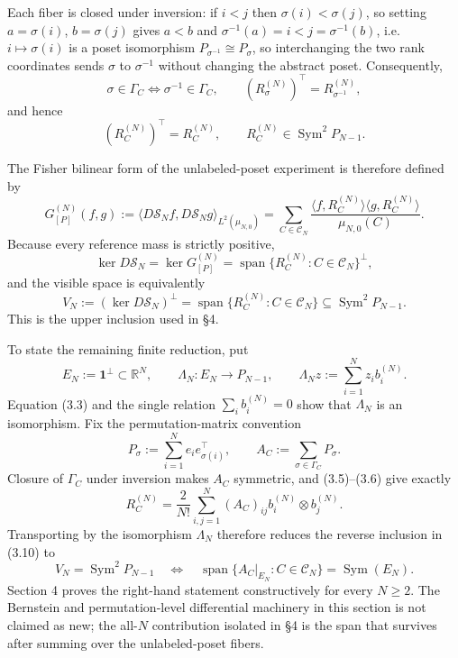 \documentclass[11pt]{article}
\begin{document}
Each fiber is closed under inversion: if \(i<j\) then \(\sigma(i)<\sigma(j)\), so setting \(a=\sigma(i)\), \(b=\sigma(j)\) gives \(a<b\) and \(\sigma^{-1}(a)=i<j=\sigma^{-1}(b)\), i.e. \(i\mapsto\sigma(i)\) is a poset isomorphism \(P_{\sigma^{-1}}\cong P_\sigma\), so interchanging the two rank coordinates sends \(\sigma\) to \(\sigma^{-1}\) without changing the abstract poset. Consequently, \[ \sigma\in\Gamma_C\Longleftrightarrow\sigma^{-1}\in\Gamma_C, \qquad \left(R_\sigma^{(N)}\right)^\top=R_{\sigma^{-1}}^{(N)}, \] and hence \[ \boxed{ \left(R_C^{(N)}\right)^\top=R_C^{(N)}, \qquad R_C^{(N)}\in\operatorname{Sym}^2P_{N-1}.} \tag{3.8} \]

The Fisher bilinear form of the unlabeled-poset experiment is therefore defined by \[ \boxed{ G_{[P]}^{(N)}(f,g) :=\langle D\mathscr S_Nf,D\mathscr S_Ng\rangle_{L^2(\mu_{N,0})} =\sum_{C\in\mathcal C_N} \frac{\langle f,R_C^{(N)}\rangle \langle g,R_C^{(N)}\rangle}{\mu_{N,0}(C)}.} \tag{3.9} \] Because every reference mass is strictly positive, \[ \ker D\mathscr S_N=\ker G_{[P]}^{(N)} =\operatorname{span}\{R_C^{(N)}:C\in\mathcal C_N\}^{\perp}, \] and the visible space is equivalently \[ \boxed{ V_N :=(\ker D\mathscr S_N)^\perp =\operatorname{span}\{R_C^{(N)}:C\in\mathcal C_N\} \subseteq\operatorname{Sym}^2P_{N-1}.} \tag{3.10} \] This is the upper inclusion used in \S4.

To state the remaining finite reduction, put \[ E_N:=\mathbf1^\perp\subset\mathbb R^N, \qquad \Lambda_N:E_N\longrightarrow P_{N-1}, \qquad \Lambda_Nz:=\sum_{i=1}^Nz_i b_i^{(N)}. \tag{3.11} \] Equation (3.3) and the single relation \(\sum_i b_i^{(N)}=0\) show that \(\Lambda_N\) is an isomorphism. Fix the permutation-matrix convention \[ P_\sigma:=\sum_{i=1}^Ne_i e_{\sigma(i)}^\top, \qquad A_C:=\sum_{\sigma\in\Gamma_C}P_\sigma. \tag{3.12} \] Closure of \(\Gamma_C\) under inversion makes \(A_C\) symmetric, and (3.5)--(3.6) give exactly \[ R_C^{(N)} =\frac2{N!}\sum_{i,j=1}^N(A_C)_{ij} b_i^{(N)}\otimes b_j^{(N)}. \tag{3.13} \] Transporting by the isomorphism \(\Lambda_N\) therefore reduces the reverse inclusion in (3.10) to \[ \boxed{ V_N=\operatorname{Sym}^2P_{N-1} \quad\Longleftrightarrow\quad \operatorname{span}\{A_C|_{E_N}:C\in\mathcal C_N\} =\operatorname{Sym}(E_N).} \tag{3.14} \] Section 4 proves the right-hand statement constructively for every \(N\ge2\). The Bernstein and permutation-level differential machinery in this section is not claimed as new; the all-\(N\) contribution isolated in \S4 is the span that survives after summing over the unlabeled-poset fibers.
\end{document}
